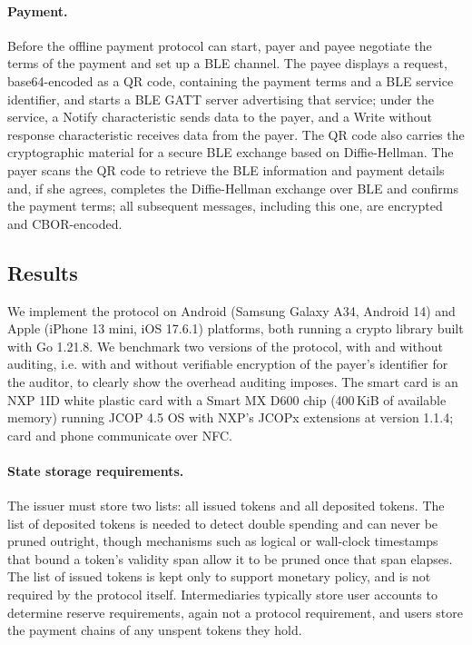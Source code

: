 \paragraph{Payment.} Before the offline payment protocol can start, payer and payee negotiate the
terms of the payment and set up a BLE channel. The payee displays a request,
base64-encoded as a QR code, containing the payment terms and a BLE service
identifier, and starts a BLE GATT server advertising that service; under the
service, a Notify characteristic sends data to the payer, and a
Write without response characteristic receives data from the payer.
The QR code also carries the cryptographic material for a secure BLE
exchange based on Diffie-Hellman. The payer scans the QR code to retrieve
the BLE information and payment details and, if she agrees, completes the
Diffie-Hellman exchange over BLE and confirms the payment terms; all
subsequent messages, including this one, are encrypted and CBOR-encoded.

\subsection{Results}

We implement the protocol on Android (Samsung Galaxy A34, Android 14) and
Apple (iPhone 13 mini, iOS 17.6.1) platforms, both running a crypto library
built with Go 1.21.8. We benchmark two versions of the protocol, with and
without auditing, i.e. with and without verifiable encryption of the
payer's identifier for the auditor, to clearly show the overhead auditing
imposes. The smart card is an NXP 1ID white plastic card with a Smart MX
D600 chip (400\,KiB of available memory) running JCOP 4.5 OS with NXP's
JCOPx extensions at version 1.1.4; card and phone communicate over NFC.

\paragraph{State storage requirements.} The issuer must store two lists: all
issued tokens and all deposited tokens. The list of deposited tokens is
needed to detect double spending and can never be pruned outright, though
mechanisms such as logical or wall-clock timestamps that bound a token's
validity span allow it to be pruned once that span elapses. The list of
issued tokens is kept only to support monetary policy, and is not required
by the protocol itself. Intermediaries typically store user accounts to
determine reserve requirements, again not a protocol requirement, and
users store the payment chains of any unspent tokens they hold.
